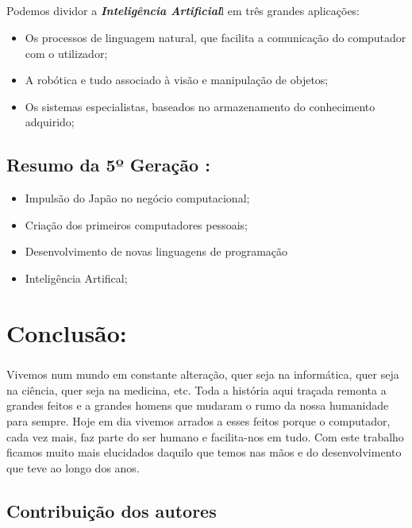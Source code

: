 \documentclass{report}
\begin{document}
\paragraph{}

Podemos dividor a \textbf{\textit{Inteligência Artificial}}l em três grandes aplicações:
\begin{itemize}
			\item Os processos de linguagem natural, que facilita a comunicação do computador com o utilizador;
			\item A robótica e tudo associado à visão e manipulação de objetos;
			\item Os sistemas especialistas, baseados no armazenamento do conhecimento adquirido;
\end{itemize}	


\section{Resumo da 5º Geração :}
\begin{itemize}
		\item  Impulsão do Japão no negócio computacional;
		\item Criação dos primeiros computadores pessoais;
		\item Desenvolvimento de novas linguagens de programação 
		\item Inteligência Artifical;
\end{itemize}

\newpage

\chapter{Conclusão:}
\label{chap:conclusao}
\paragraph{}	
Vivemos num mundo em constante alteração, quer seja na informática, quer seja na ciência, quer seja na medicina, etc. Toda a história aqui traçada remonta a grandes feitos e a grandes homens que mudaram o rumo da nossa humanidade para sempre. Hoje em dia vivemos arrados a esses feitos porque o computador, cada vez mais, faz parte do ser humano e facilita-nos em tudo. Com este trabalho ficamos muito mais elucidados daquilo que temos nas mãos e do desenvolvimento que teve ao longo dos anos. 

\newpage
\section{Contribuição dos autores}
\end{document}
